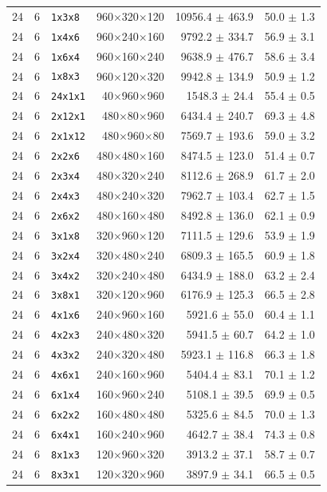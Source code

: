 \begin{longtable}{rrlrrr}
24 & 6 & \texttt{1x3x8} & 960$\times$320$\times$120 & 10956.4 $\pm$ 463.9 & 50.0 $\pm$ 1.3 \\
24 & 6 & \texttt{1x4x6} & 960$\times$240$\times$160 & 9792.2 $\pm$ 334.7 & 56.9 $\pm$ 3.1 \\
24 & 6 & \texttt{1x6x4} & 960$\times$160$\times$240 & 9638.9 $\pm$ 476.7 & 58.6 $\pm$ 3.4 \\
24 & 6 & \texttt{1x8x3} & 960$\times$120$\times$320 & 9942.8 $\pm$ 134.9 & 50.9 $\pm$ 1.2 \\
24 & 6 & \texttt{24x1x1} & 40$\times$960$\times$960 & 1548.3 $\pm$ 24.4 & 55.4 $\pm$ 0.5 \\
24 & 6 & \texttt{2x12x1} & 480$\times$80$\times$960 & 6434.4 $\pm$ 240.7 & 69.3 $\pm$ 4.8 \\
24 & 6 & \texttt{2x1x12} & 480$\times$960$\times$80 & 7569.7 $\pm$ 193.6 & 59.0 $\pm$ 3.2 \\
24 & 6 & \texttt{2x2x6} & 480$\times$480$\times$160 & 8474.5 $\pm$ 123.0 & 51.4 $\pm$ 0.7 \\
24 & 6 & \texttt{2x3x4} & 480$\times$320$\times$240 & 8112.6 $\pm$ 268.9 & 61.7 $\pm$ 2.0 \\
24 & 6 & \texttt{2x4x3} & 480$\times$240$\times$320 & 7962.7 $\pm$ 103.4 & 62.7 $\pm$ 1.5 \\
24 & 6 & \texttt{2x6x2} & 480$\times$160$\times$480 & 8492.8 $\pm$ 136.0 & 62.1 $\pm$ 0.9 \\
24 & 6 & \texttt{3x1x8} & 320$\times$960$\times$120 & 7111.5 $\pm$ 129.6 & 53.9 $\pm$ 1.9 \\
24 & 6 & \texttt{3x2x4} & 320$\times$480$\times$240 & 6809.3 $\pm$ 165.5 & 60.9 $\pm$ 1.8 \\
24 & 6 & \texttt{3x4x2} & 320$\times$240$\times$480 & 6434.9 $\pm$ 188.0 & 63.2 $\pm$ 2.4 \\
24 & 6 & \texttt{3x8x1} & 320$\times$120$\times$960 & 6176.9 $\pm$ 125.3 & 66.5 $\pm$ 2.8 \\
24 & 6 & \texttt{4x1x6} & 240$\times$960$\times$160 & 5921.6 $\pm$ 55.0 & 60.4 $\pm$ 1.1 \\
24 & 6 & \texttt{4x2x3} & 240$\times$480$\times$320 & 5941.5 $\pm$ 60.7 & 64.2 $\pm$ 1.0 \\
24 & 6 & \texttt{4x3x2} & 240$\times$320$\times$480 & 5923.1 $\pm$ 116.8 & 66.3 $\pm$ 1.8 \\
24 & 6 & \texttt{4x6x1} & 240$\times$160$\times$960 & 5404.4 $\pm$ 83.1 & 70.1 $\pm$ 1.2 \\
24 & 6 & \texttt{6x1x4} & 160$\times$960$\times$240 & 5108.1 $\pm$ 39.5 & 69.9 $\pm$ 0.5 \\
24 & 6 & \texttt{6x2x2} & 160$\times$480$\times$480 & 5325.6 $\pm$ 84.5 & 70.0 $\pm$ 1.3 \\
24 & 6 & \texttt{6x4x1} & 160$\times$240$\times$960 & 4642.7 $\pm$ 38.4 & 74.3 $\pm$ 0.8 \\
24 & 6 & \texttt{8x1x3} & 120$\times$960$\times$320 & 3913.2 $\pm$ 37.1 & 58.7 $\pm$ 0.7 \\
24 & 6 & \texttt{8x3x1} & 120$\times$320$\times$960 & 3897.9 $\pm$ 34.1 & 66.5 $\pm$ 0.5 \\
\bottomrule
\end{longtable}
